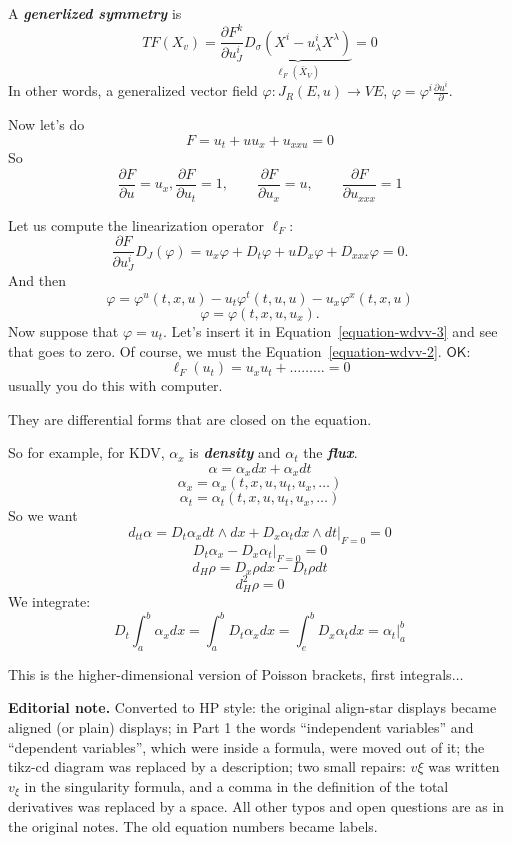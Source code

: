 A {\it\bf generlized symmetry} is
$$TF(X_v)=\frac{\partial F^k}{\partial
u^i_J}\underbrace{D_\sigma(X^i-u^i_\lambda
X^\lambda)}_{\ell_F(\bar{X}_V)}=0$$
In other words, a generalized vector field
$\varphi:J_R(E,u)\to VE$, $\varphi=\varphi^i
\frac{\partial  u^i}{\partial }$.

Now let's do
\begin{equation}
\label{equation-wdvv-2}
F=u_t+u u_x + u_{x x u}=0
\end{equation}
So
$$\frac{\partial F}{\partial u}=u_x,
\frac{\partial F}{\partial u_t}=1,\qquad
\frac{\partial F}{\partial u_x}=u ,\qquad
\frac{\partial F}{\partial u_{x x x}}=1$$

Let us compute the linearization operator
$\ell_F$:
$$\frac{\partial F}{\partial u^i_J}D_J
(\varphi)=u_x\varphi+D_t \varphi+u D_x
\varphi+ D_{x x x }\varphi=0.$$
And then
\begin{equation}
\label{equation-wdvv-3}
\varphi=\varphi^u(t,x,u)-u_t
\varphi^t(t,u,u)-u_x \varphi^x(t,x,u)
\end{equation}
$$\varphi=\varphi(t,x,u,u_x).$$
Now suppose that $\varphi=u_t$. Let's insert
it in  Equation~\ref{equation-wdvv-3} and see
that goes to zero. Of course, we must the
Equation~\ref{equation-wdvv-2}.
$\mathsf{OK}$:
$$\ell_F(u_t)=u_xu_t+\ldots \ldots \ldots
=0$$
usually you do this with computer.

\medskip{}
They are differential forms that are closed
on the equation.

So for example, for KDV, $\alpha_x$ is
{\it\bf density} and  $\alpha_t$ the {\it\bf
flux}.
$$\alpha=\alpha_x dx+\alpha_x dt$$
$$\alpha_x=\alpha_x (t,x,u,u_t,u_x,\ldots)$$
$$\alpha_t=\alpha_t(t,x,u,u_t,u_x,\ldots)$$
So we want
$$d_{t t}\alpha=D_t\alpha_x dt \wedge dx+ D_x
\alpha_t dx \wedge dt\Big|_{F=0}=0$$
$$D_t\alpha_x-D_x \alpha_t \Big|_{F=0}=0$$
$$d_H\rho=D_x\rho dx-D_t\rho dt$$
$$d^2_H\rho=0$$
We integrate:
$$D_t \int_{a}^b\alpha_x dx=\int_{a}^b D_t
\alpha_x dx=\int_{e}^b D_x \alpha_t
dx=\alpha_t|_{a}^b$$

\medskip{}
This is the higher-dimensional version of
Poisson brackets, first integrals$\ldots$

\medskip\noindent
{\bf Editorial note.}
Converted to HP style: the original
align-star displays became aligned (or
plain) displays; in Part 1 the words
``independent variables'' and ``dependent
variables'', which were inside a formula,
were moved out of it; the tikz-cd diagram
was replaced by a description; two small
repairs: $v\xi$ was written $v_\xi$ in the
singularity formula, and a comma in the
definition of the total derivatives was
replaced by a space. All other typos and
open questions are as in the original
notes. The old equation numbers became
labels.

